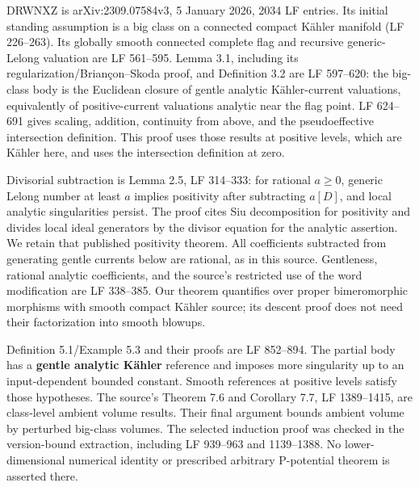 \documentclass[11pt]{article}
\begin{document}
DRWNXZ is arXiv:2309.07584v3, 5 January 2026, 2034 LF entries. Its initial standing assumption is a big class on a connected compact Kähler manifold (LF 226–263). Its globally smooth connected complete flag and recursive generic-\allowbreak{}Lelong valuation are LF 561–595. Lemma 3.1, including its regularization/\allowbreak{}Briançon–Skoda proof, and Definition 3.2 are LF 597–620: the big-\allowbreak{}class body is the Euclidean closure of gentle analytic Kähler-\allowbreak{}current valuations, equivalently of positive-\allowbreak{}current valuations analytic near the flag point. LF 624–691 gives scaling, addition, continuity from above, and the pseudoeffective intersection definition. This proof uses those results at positive levels, which are Kähler here, and uses the intersection definition at zero.

Divisorial subtraction is Lemma 2.5, LF 314–333: for rational $a\geq0$, generic Lelong number at least $a$ implies positivity after subtracting $a[D]$, and local analytic singularities persist. The proof cites Siu decomposition for positivity and divides local ideal generators by the divisor equation for the analytic assertion. We retain that published positivity theorem. All coefficients subtracted from generating gentle currents below are rational, as in this source. Gentleness, rational analytic coefficients, and the source's restricted use of the word modification are LF 338–385. Our theorem quantifies over proper bimeromorphic morphisms with smooth compact Kähler source; its descent proof does not need their factorization into smooth blowups.

Definition 5.1/\allowbreak{}Example 5.3 and their proofs are LF 852–894. The partial body has a \textbf{gentle analytic Kähler} reference and imposes more singularity up to an input-\allowbreak{}dependent bounded constant. Smooth references at positive levels satisfy those hypotheses. The source's Theorem 7.6 and Corollary 7.7, LF 1389–1415, are class-\allowbreak{}level ambient volume results. Their final argument bounds ambient volume by perturbed big-\allowbreak{}class volumes. The selected induction proof was checked in the version-\allowbreak{}bound extraction, including LF 939–963 and 1139–1388. No lower-\allowbreak{}dimensional numerical identity or prescribed arbitrary P-\allowbreak{}potential theorem is asserted there.
\end{document}

